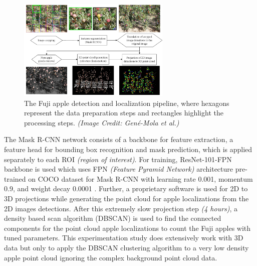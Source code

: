 \documentclass{article}
\begin{document}
\begin{figure}[h]
    \centering
    \includegraphics[width=0.65\textwidth]{fuji-sfm-pipeline.png}
    \caption{The Fuji apple detection and localization pipeline, where hexagons represent the data preparation steps and rectangles highlight the processing steps. \textit{(Image Credit: Gen{\'e}-Mola et al.)}}
    \label{fig:fuji-sfm-pipeline}
\end{figure}


The Mask R-CNN network consists of a backbone for feature extraction, a feature head for bounding box recognition and mask prediction, which is applied separately to each ROI \textit{(region of interest)}.
For training, ResNet-101-FPN backbone is used which uses FPN \textit{(Feature Pyramid Network)} architecture pre-trained on COCO dataset for Mask R-CNN with learning rate 0.001, momentum 0.9, and weight decay 0.0001 \cite{lin2017feature, he2016identity, lin2014microsoft}.
Further, a proprietary software is used for 2D to 3D projections while generating the point cloud for apple localizations from the 2D images detections.
After this extremely slow projection step \textit{(4 hours)}, a density based scan algorithm (DBSCAN) is used to find the connected components for the point cloud apple localizations to count the Fuji apples with tuned parameters.
This experimentation study does extensively work with 3D data but only to apply the DBSCAN clustering algorithm to a very low density apple point cloud ignoring the complex background point cloud data.
\end{document}
